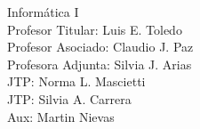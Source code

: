\thispagestyle{empty}

\Large{Informática I}\\

\noindent Profesor Titular: Luis E. Toledo\\
Profesor Asociado: Claudio J. Paz\\
Profesora Adjunta: Silvia J. Arias\\

\medskip
\noindent JTP: Norma L. Mascietti\\
JTP: Silvia A. Carrera\\
Aux: Martin Nievas


